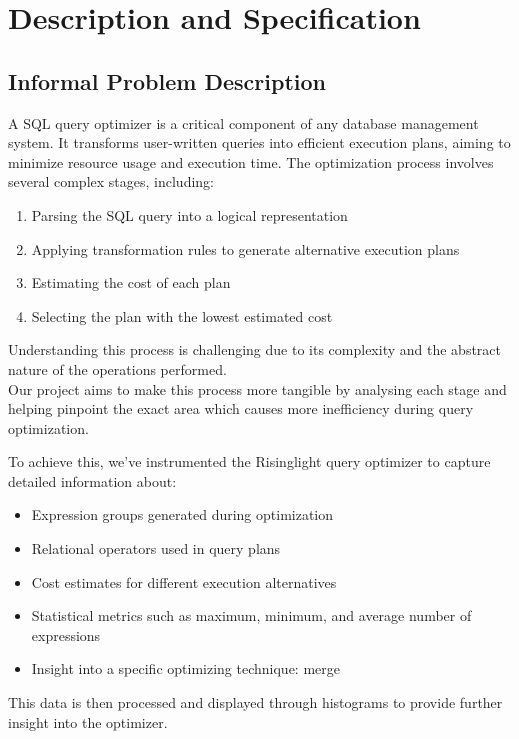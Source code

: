 \documentclass[a4paper,12pt]{scrreprt}
\begin{document}
\chapter{Description and Specification}\label{chap:analiseEspecificacao}
\section{Informal Problem Description}\label{sec:descricaoProblema}

A SQL query optimizer is a critical component of any database management system. It transforms user-written queries into efficient execution plans, aiming to minimize resource usage and execution time. The optimization process involves several complex stages, including:
\begin{enumerate}
    \item Parsing the SQL query into a logical representation
    \item Applying transformation rules to generate alternative execution plans
    \item Estimating the cost of each plan
    \item Selecting the plan with the lowest estimated cost
\end{enumerate}

Understanding this process is challenging due to its complexity and the abstract nature of the operations performed. \\
Our project aims to make this process more tangible by analysing each stage and helping pinpoint the exact area which causes more inefficiency during query optimization.

To achieve this, we've instrumented the Risinglight query optimizer to capture detailed information about:
\begin{itemize}
    \item Expression groups generated during optimization
    \item Relational operators used in query plans
    \item Cost estimates for different execution alternatives
    \item Statistical metrics such as maximum, minimum, and average number of expressions
    \item Insight into a specific optimizing technique: merge
\end{itemize}

This data is then processed and displayed through histograms to provide further insight into the optimizer.
\end{document}
